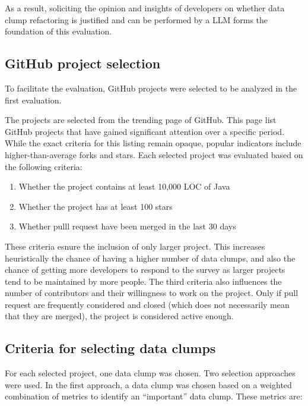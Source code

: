 As a result, soliciting  the opinion and insights of developers on whether data clump refactoring is justified and can be performed by a \ac{LLM}  forms the foundation of this evaluation.



\subsection{GitHub project selection}\label{sec:github_projects}

To facilitate the evaluation, GitHub projects were selected to be analyzed in the first evaluation. 


The projects are selected from the trending page of GitHub. This page list GitHub projects that have gained significant attention over a specific  period. While the exact criteria for this listing remain opaque, popular indicators include higher-than-average forks and stars. Each selected project was evaluated based on the following criteria:
\begin{enumerate}
    \item Whether the project contains at least  10,000 \ac{LOC} of Java
        \item Whether the project  has at least 100 stars
\item Whether pulll request have been merged in the last 30 days
\end{enumerate}

These criteria esnure the inclusion of  only larger project. This increases heuristically the chance of having a higher number of data clumps, and also the chance of getting more developers to respond to the survey as larger projects tend to be maintained by more people. The third criteria also influences the number of contributors and their willingness to work on the project. Only if pull request are frequently considered and closed (which does not necessarily mean that they are merged), the project is considered active enough. 


\subsection{Criteria for selecting data clumps}

For each selected project, one data clump was chosen. Two selection approaches were used. 
In the first approach, a data clump was chosen based on a weighted combination of metrics to identify an \enquote{important} data clump. These metrics are:


